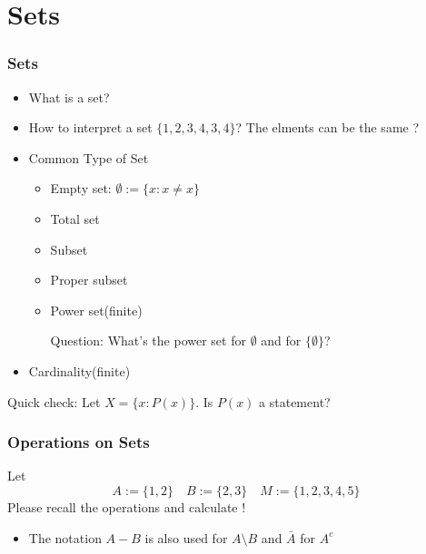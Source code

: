 \documentclass{beamer}
\begin{document}
\section{Sets}
\begin{frame}
    \frametitle{Sets}
    \begin{itemize}
        \item What is a set?
        \item How to interpret a set $\{1,2,3,4,3,4\}$? The elments can be the same ?
        \item Common Type of Set
              \begin{itemize}
                  \item Empty set: $\emptyset := \{x:x\neq x\}$
                  \item Total set
                  \item Subset
                  \item Proper subset
                  \item Power set(finite)

                        Question: What's the power set for $\emptyset$ and for $\{\emptyset\}$?
              \end{itemize}
        \item Cardinality(finite)
    \end{itemize}
    \vspace*{1em}
    \begin{block}{
            Quick check:}
        \hspace{1em}
        Let $X=\{x:P(x)\}.$  Is $P(x)$ a statement?
    \end{block}
\end{frame}
\begin{frame}
    \frametitle{Operations on Sets}
    Let
    \begin{equation*}
        A:=\{1,2\} \quad B:=\{2,3\} \quad M:=\{1,2,3,4,5\}
    \end{equation*}
    Please recall the operations and calculate !
    \begin{table}
        \centering
    \end{table}
    \begin{itemize}
        \item The notation $A - B $ is also used for $A\setminus B$ and $\bar{A}$ for $A^c$
    \end{itemize}
\end{frame}
\end{document}
